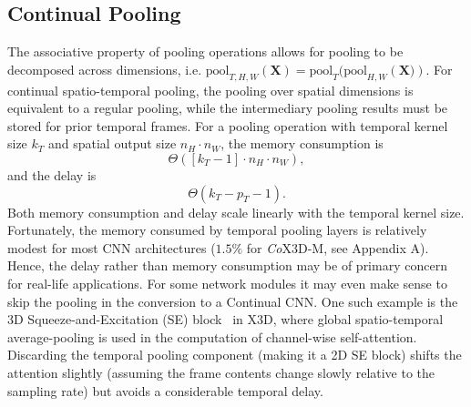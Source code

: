 \vspace{-3mm}
\subsection{Continual Pooling}  \label{sec:pooling}
\vspace{-1mm}
The associative property of pooling operations allows for pooling to be decomposed across dimensions, i.e. $\textrm{pool}_{T, H, W}(\mathbf{X}) = \textrm{pool}_{T}(\textrm{pool}_{H, W}\left(\mathbf{X})\right)$.
For continual spatio-temporal pooling, the pooling over spatial dimensions is equivalent to a regular pooling, while the intermediary pooling results must be stored for prior temporal frames. For a pooling operation with temporal kernel size $k_T$ and spatial output size $n_H \cdot n_W $, the memory consumption is
%
\begin{equation}
    \Theta([k_T - 1] \cdot n_H \cdot n_W),
\label{eq:pooling-mem}
\end{equation}
and the delay is
\begin{equation}
    \Theta(k_T - p_T - 1).
\label{eq:pooling-delay}
\end{equation}
%
Both memory consumption and delay scale linearly with the temporal kernel size.
Fortunately, the memory consumed by temporal pooling layers is relatively modest for most CNN architectures ($1.5 \%$ for \textit{Co}X3D-M, see Appendix A). Hence, the delay rather than memory consumption may be of primary concern for real-life applications.
For some network modules it may even make sense to skip the pooling in the conversion to a Continual CNN.
One such example is the 3D Squeeze-and-Excitation (SE) block~\cite{hu2018squeeze} in X3D, where global spatio-temporal average-pooling is used in the computation of channel-wise self-attention. 
Discarding the temporal pooling component (making it a 2D SE block) shifts the attention slightly (assuming the frame contents change slowly relative to the sampling rate) but avoids a considerable temporal delay.



